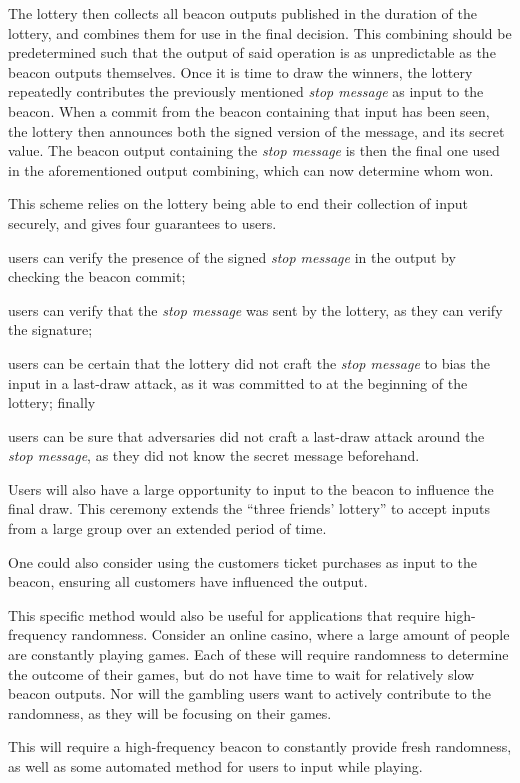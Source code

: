 The lottery then collects all beacon outputs published in the duration of the lottery, and combines them for use in the final decision.
This combining should be predetermined such that the output of said operation is as unpredictable as the beacon outputs themselves.
Once it is time to draw the winners, the lottery repeatedly contributes the previously mentioned \textit{stop message} as input to the beacon.
When a commit from the beacon containing that input has been seen, the lottery then announces both the signed version of the message, and its secret value.
The beacon output containing the \textit{stop message} is then the final one used in the aforementioned output combining, which can now determine whom won.

This scheme relies on the lottery being able to end their collection of input securely, and gives four guarantees to users.
\begin{enumberate*}
\item users can verify the presence of the signed \textit{stop message} in the output by checking the beacon commit;
\item users can verify that the \textit{stop message} was sent by the lottery, as they can verify the signature;
\item users can be certain that the lottery did not craft the \textit{stop message} to bias the input in a last-draw attack, as it was committed to at the beginning of the lottery; finally
\item users can be sure that adversaries did not craft a last-draw attack around the \textit{stop message}, as they did not know the secret message beforehand.
\end{enumberate*}

Users will also have a large opportunity to input to the beacon to influence the final draw.
This ceremony extends the \enquote{three friends' lottery} to accept inputs from a large group over an extended period of time.

One could also consider using the customers ticket purchases as input to the beacon, ensuring all customers have influenced the output.


This specific method would also be useful for applications that require high-frequency randomness.
Consider an online casino, where a large amount of people are constantly playing games.
Each of these will require randomness to determine the outcome of their games, but do not have time to wait for relatively slow beacon outputs.
Nor will the gambling users want to actively contribute to the randomness, as they will be focusing on their games.

This will require a high-frequency beacon to constantly provide fresh randomness, as well as some automated method for users to input while playing.
